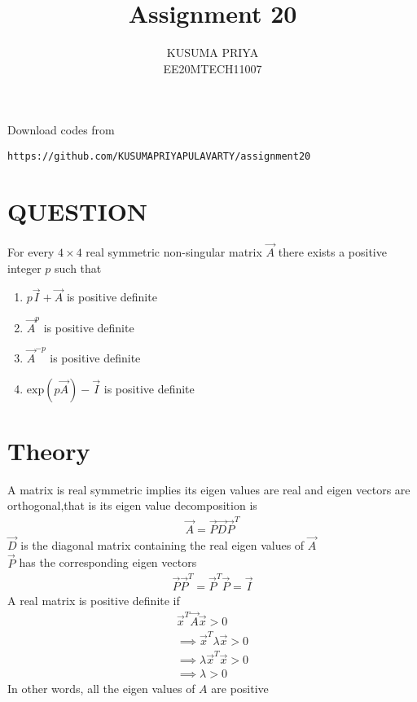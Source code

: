 \documentclass[journal,12pt,twocolumn]{IEEEtran}
\begin{document}
\renewcommand{\thefigure}{\theproblem}

\def\putbox#1#2#3{\makebox[0in][l]{\makebox[#1][l]{}\raisebox{\baselineskip}[0in][0in]{\raisebox{#2}[0in][0in]{#3}}}}
     \def\rightbox#1{\makebox[0in][r]{#1}}
     \def\centbox#1{\makebox[0in]{#1}}
     \def\topbox#1{\raisebox{-\baselineskip}[0in][0in]{#1}}
     \def\midbox#1{\raisebox{-0.5\baselineskip}[0in][0in]{#1}}
\vspace{3cm}
\title{Assignment 20}
\author{KUSUMA PRIYA\\EE20MTECH11007}

\maketitle
\newpage

\bigskip
\renewcommand{\thefigure}{\theenumi}
\renewcommand{\thetable}{\theenumi}
Download codes from 
%
\begin{lstlisting}
https://github.com/KUSUMAPRIYAPULAVARTY/assignment20
\end{lstlisting}
%
 
\section{QUESTION}
For every $4 \times 4$ real symmetric non-singular matrix $\vec{A}$ there exists a positive integer $p$ such that

    \begin{enumerate}
        \item $p\vec{I}+\vec{A}$ is positive definite
        \item $\vec{A}^p$ is positive definite
        \item $\vec{A}^{-p}$ is positive definite
        \item $\text{exp}(p\vec{A})-\vec{I}$ is positive definite
        \end{enumerate}

%
\section{Theory}
A matrix is real symmetric implies its eigen values are real and eigen vectors are orthogonal,that is its eigen value decomposition is
\begin{align}
 \vec{A}=\vec{P}\vec{D}\vec{P}^T
\end{align}
$\vec{D}$ is the diagonal matrix containing the real eigen values of $\vec{A}$\\
$\vec{P}$ has the corresponding eigen vectors
\begin{align}
    \vec{P}\vec{P}^T=\vec{P}^T\vec{P}=\vec{I}
\end{align}
A real matrix is positive definite if 
\begin{align}
    \vec{x}^T\vec{A}\vec{x}>0\\
    \implies  \vec{x}^T\lambda\vec{x}>0\\
    \implies \lambda \vec{x}^T\vec{x}>0\\
    \implies \lambda>0
\end{align}
In other words, all the eigen values of $A$ are positive
\end{document}
